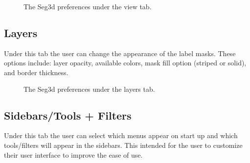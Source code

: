 \documentclass[fleqn,11pt,openany]{book}
\begin{document}
\begin{figure}[h!]
\caption{The Seg3d preferences under the view tab.}\label{fig:Pref_view}
\end{figure}

\newpage

\subsection{Layers}
Under this tab the user can change the appearance of the label masks. These options include: layer opacity, available colors, mask fill option (striped or solid), and border thickness.

\begin{figure}[h!]
\caption{The Seg3d preferences under the layers tab.}\label{fig:Pref_layers}
\end{figure}


\subsection{Sidebars/Tools + Filters}
Under this tab the user can select which menus appear on start up and which tools/filters will appear in the 
sidebars.  This intended for the user to customize their user interface to improve the ease of use.
\end{document}
